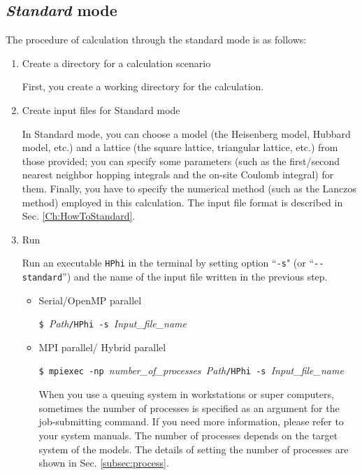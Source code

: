 \subsection{{\it Standard} mode}

The procedure of calculation through the standard mode is as follows:

\begin{enumerate}

\item Create a directory for a calculation scenario

First, you create a working directory for the calculation.

\item Create input files for Standard mode

In Standard mode, you can choose a model (the Heisenberg model, Hubbard model, etc.) and 
a lattice (the square lattice, triangular lattice, etc.) from those provided;
you can specify some parameters
(such as the first/second nearest neighbor hopping integrals and
the on-site Coulomb integral) for them.
Finally, you have to specify the numerical method (such as the Lanczos method) employed in this calculation.
The input file format is described in Sec. \ref{Ch:HowToStandard}.

\item  Run

  Run an executable \verb|HPhi| in the terminal by setting option ``\verb|-s|"
  (or ``\verb|--standard|'') and the name of the input file written in the previous step.

\begin{itemize}

\item Serial/OpenMP parallel

  \verb|$ |\textit{Path}\verb|/HPhi -s |\textit{Input\_file\_name}

\item MPI parallel/ Hybrid parallel

  \verb|$ mpiexec -np |\textit{number\_of\_processes}\verb| |\textit{Path}\verb|/HPhi -s |\textit{Input\_file\_name}

  When you use a queuing system in workstations or super computers, 
  sometimes the number of processes is specified as an argument for the job-submitting command.
  If you need more information, please refer to your system manuals. 
  The number of processes depends on the target system of the models.
  The details of setting the number of processes are shown in Sec. \ref{subsec:process}.
\end{itemize}


\end{enumerate}
